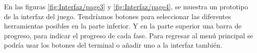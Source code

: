 En las figuras \ref{fig:Interfaz/page3} y \ref{fig:Interfaz/page4}, se muestra un prototipo de la interfaz del juego. Tendríamos botones para seleccionar las diferentes herramientas posibles en la parte inferior. Y en la parte superior una barra de progreso, para indicar el progreso de cada fase. Para regresar al menú principal se podría usar los botones del terminal o añadir uno a la interfaz también.

